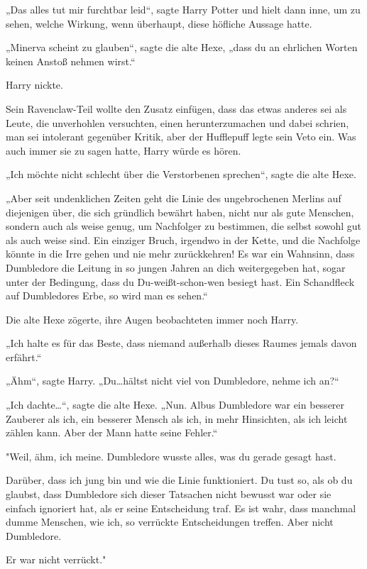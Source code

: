 {„Das alles tut mir furchtbar leid“, sagte Harry Potter und hielt dann inne, um zu sehen, welche Wirkung, wenn überhaupt, diese höfliche Aussage hatte.

„Minerva scheint zu glauben“, sagte die alte Hexe, „dass du an ehrlichen Worten keinen Anstoß nehmen wirst.“

Harry nickte.

Sein Ravenclaw-Teil wollte den Zusatz einfügen, dass das etwas anderes sei als Leute, die unverhohlen versuchten, einen herunterzumachen und dabei schrien, man sei intolerant gegenüber Kritik, aber der Hufflepuff legte sein Veto ein. Was auch immer sie zu sagen hatte, Harry würde es hören.

„Ich möchte nicht schlecht über die Verstorbenen sprechen“, sagte die alte Hexe.

„Aber seit undenklichen Zeiten geht die Linie des ungebrochenen Merlins auf diejenigen über, die sich gründlich bewährt haben, nicht nur als gute Menschen, sondern auch als weise genug, um Nachfolger zu bestimmen, die selbst sowohl gut als auch weise sind. Ein einziger Bruch, irgendwo in der Kette, und die Nachfolge könnte in die Irre gehen und nie mehr zurückkehren! Es war ein Wahnsinn, dass Dumbledore die Leitung in so jungen Jahren an dich weitergegeben hat, sogar unter der Bedingung, dass du Du-weißt-schon-wen besiegt hast. Ein Schandfleck auf Dumbledores Erbe, so wird man es sehen.“

Die alte Hexe zögerte, ihre Augen beobachteten immer noch Harry.

„Ich halte es für das Beste, dass niemand außerhalb dieses Raumes jemals davon erfährt.“

„Ähm“, sagte Harry. „Du…hältst nicht viel von Dumbledore, nehme ich an?“

„Ich dachte…“, sagte die alte Hexe. „Nun. Albus Dumbledore war ein besserer Zauberer als ich, ein besserer Mensch als ich, in mehr Hinsichten, als ich leicht zählen kann. Aber der Mann hatte seine Fehler.“

"Weil, ähm, ich meine. Dumbledore wusste alles, was du gerade gesagt hast.

Darüber, dass ich jung bin und wie die Linie funktioniert. Du tust so, als ob du glaubst, dass Dumbledore sich dieser Tatsachen nicht bewusst war oder sie einfach ignoriert hat, als er seine Entscheidung traf. Es ist wahr, dass manchmal dumme Menschen, wie ich, so verrückte Entscheidungen treffen. Aber nicht Dumbledore.

Er war nicht verrückt."

}
